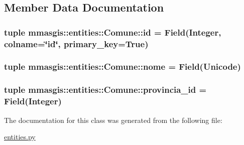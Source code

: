 \subsection{Member Data Documentation}
\hypertarget{classmmasgis_1_1entities_1_1Comune_a5c61ab3206f4829b3ea5e5b3343569fa}{
\subsubsection[{id}]{\setlength{\rightskip}{0pt plus 5cm}tuple {\bf mmasgis::entities::Comune::id} = Field(Integer, colname=\char`\"{}id\char`\"{}, primary\_\-key=True)}}
\label{classmmasgis_1_1entities_1_1Comune_a5c61ab3206f4829b3ea5e5b3343569fa}
\hypertarget{classmmasgis_1_1entities_1_1Comune_a93657c0ac0d0a8db86ac2e359f6f7b63}{
\subsubsection[{nome}]{\setlength{\rightskip}{0pt plus 5cm}tuple {\bf mmasgis::entities::Comune::nome} = Field(Unicode)}}
\label{classmmasgis_1_1entities_1_1Comune_a93657c0ac0d0a8db86ac2e359f6f7b63}
\hypertarget{classmmasgis_1_1entities_1_1Comune_adbd00de282780b1f231323edf44defc8}{
\subsubsection[{provincia\_\-id}]{\setlength{\rightskip}{0pt plus 5cm}tuple {\bf mmasgis::entities::Comune::provincia\_\-id} = Field(Integer)}}
\label{classmmasgis_1_1entities_1_1Comune_adbd00de282780b1f231323edf44defc8}


The documentation for this class was generated from the following file:\begin{DoxyCompactItemize}
\item 
\hyperlink{entities_8py}{entities.py}\end{DoxyCompactItemize}
